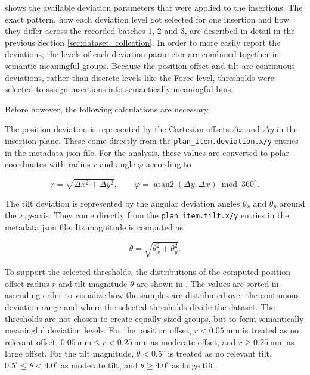  shows the available deviation parameters that were applied to the insertions. The exact pattern, how each deviation level got selected for one insertion and how they differ across the recorded batches 1, 2 and 3, are described in detail in the previous Section \ref{sec:dataset_collection}.
In order to more easily report the deviations, the levels of each deviation parameter are combined together in semantic meaningful groups. Because the position offset and tilt are continuous deviations, rather than discrete levels like the Force level, thresholds were selected to assign insertions into semantically meaningful bins.

Before however, the following calculations are necessary.

The position deviation is represented by the Cartesian offsets $\Delta x$ and $\Delta y$ in the insertion plane. These come directly from the \texttt{plan\_item.deviation.x/y} entries in the metadata json file. For the analysis, these values are converted to polar coordinates with radius $r$ and angle $\varphi$ according to

\begin{equation}
    r = \sqrt{\Delta x^2 + \Delta y^2},
    \qquad
    \varphi = \operatorname{atan2}(\Delta y, \Delta x) \bmod 360^\circ .
    \label{eq:polar_coordinates}
\end{equation}

The tilt deviation is represented by the angular deviation angles $\theta_x$ and $\theta_y$ around the $x,y$-axis. They come directly from the \texttt{plan\_item.tilt.x/y} entries in the metadata json file. Its magnitude is computed as

\begin{equation}
    \theta = \sqrt{\theta_x^2 + \theta_y^2}.
    \label{eq:tilt_mag}
\end{equation}

To support the selected thresholds, the distributions of the computed position offset radius $r$ and tilt magnitude $\theta$ are shown in . The values are sorted in ascending order to visualize how the samples are distributed over the continuous deviation range and where the selected thresholds divide the dataset. The thresholds are not chosen to create equally sized groups, but to form semantically meaningful deviation levels. For the position offset, $r < 0.05~\mathrm{mm}$ is treated as no relevant offset, $0.05~\mathrm{mm} \leq r < 0.25~\mathrm{mm}$ as moderate offset, and $r \geq 0.25~\mathrm{mm}$ as large offset. For the tilt magnitude, $\theta < 0.5^\circ$ is treated as no relevant tilt, $0.5^\circ \leq \theta < 4.0^\circ$ as moderate tilt, and $\theta \geq 4.0^\circ$ as large tilt.

